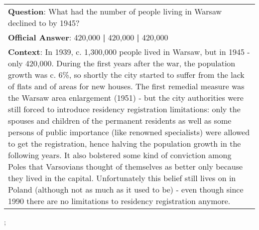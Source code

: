 \begin{figure*}[ht]
{\begin{tabular}{p{}}
            \textbf{Question}: What had the number of people living in Warsaw declined to by 1945?                                                                                                                                                                                                                                                                                                                                                                                                                                                                                                                                                                                                                                                                                                                                                                                                                                                                                                          \\
            \textbf{Official Answer}: 420,000 \textbf{|} 420,000 \textbf{|} 420,000                                                                                                                                                                                                                                                                                                                                                                                                                                                                                                                                                                                                                                                                                                                                                                                                                                                                                                                         \\
            \textbf{Context}: In 1939, c. 1,300,000 people lived in Warsaw, but in 1945 - only 420,000. During the first years after the war, the population growth was c. 6\%, so shortly the city started to suffer from the lack of flats and of areas for new houses. The first remedial measure was the Warsaw area enlargement (1951) - but the city authorities were still forced to introduce residency registration limitations: only the spouses and children of the permanent residents as well as some persons of public importance (like renowned specialists) were allowed to get the registration, hence halving the population growth in the following years. It also bolstered some kind of conviction among Poles that Varsovians thought of themselves as better only because they lived in the capital. Unfortunately this belief still lives on in Poland (although not as much as it used to be) - even though since 1990 there are no limitations to residency registration anymore. \\
        \end{tabular}
    };
    \label{fig:ex-57337f6ad058e614000b5bcc}
\end{figure*}

